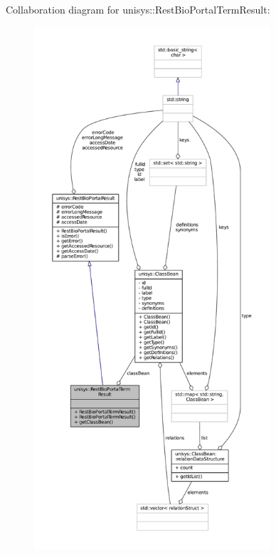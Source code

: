Collaboration diagram for unisys\-:\-:Rest\-Bio\-Portal\-Term\-Result\-:
\nopagebreak
\begin{figure}[H]
\begin{center}
\leavevmode
\includegraphics[height=550pt]{classunisys_1_1RestBioPortalTermResult__coll__graph}
\end{center}
\end{figure}
